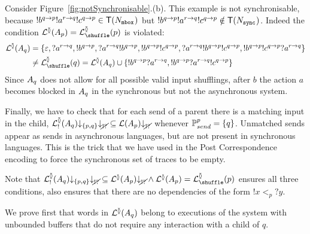\documentclass[submission,copyright,creativecommons,UKenglish]{eptcs}
\begin{document}
\begin{example}
	Consider Figure~\ref{fig:notSynchronisable}.(b).
	This example is not synchronisable, because $ !b^{q \rightarrow p} !a^{r \rightarrow q} !c^{q \rightarrow p} \in \mathsf{T}(N_{{\mathtt{mbox}}^{}}) $ but $ !b^{q \rightarrow p} !a^{r \rightarrow q} !c^{q \rightarrow p} \notin \mathsf{T}(N_{{\mathtt{sync}}^{}}) $.
	Indeed the condition $ \LangTree{\Automaton{p}} = \LangShuffle{p} $ is violated:
	\begin{align*}
		\LangTree{\Automaton{q}} &= \Set{\emptyword, \rec{a}{\rootP}{q}, \send{b}{q}{p}, \rec{a}{\rootP}{q} \send{b}{q}{p}, \send{b}{q}{p} \send{c}{q}{p}, \rec{a}{\rootP}{q} \send{b}{q}{p} \send{c}{q}{p}, \send{b}{q}{p} \send{c}{q}{p} \rec{a}{\rootP}{q}}\\
		&\neq \LangShuffle{q}
		= \LangTree{\Automaton{q}} \cup \Set{ \send{b}{q}{p} \rec{a}{\rootP}{q}, \send{b}{q}{p} \rec{a}{\rootP}{q} \send{c}{q}{p} }
	\end{align*}
	Since $ A_{q} $ does not allow for all possible valid input shufflings, after $ b $ the action $ a $ becomes blocked in $ A_{q} $ in the synchronous but not the asynchronous system.
\end{example}

Finally, we have to check that for each send of a parent there is a matching input in the child, \ie $ \mathcal{L}_{!}^{\between}{\left( A_{q} \right)}{\downarrow_{{\left\lbrace p, q \right\rbrace}}}{\downarrow_{\cancel{!?}}} \subseteq \mathcal{L}{\left(A_{p}\right)}{\downarrow_{\cancel{!?}}} $ whenever $ \mathbb{P}_{send}^{p} = {\left\lbrace q \right\rbrace} $.
Unmatched sends appear as sends in asynchronous languages, but are not present in synchronous languages.
This is the trick that we have used in the Post Correspondence encoding to force the synchronous set of traces to be empty.


Note that $ \LangTreeOut{\Automaton{q}}\projPeers{\Set{p, q}}\projMess \subseteq \LangTree{\Automaton{p}}\projMess \wedge \LangTree{\Automaton{p}} = \LangShuffle{p} $ ensures all three conditions, \ie also ensures that there are no dependencies of the form $ !x <_p ?y $.

We prove first that words in $ \mathcal{L}^{\between}{\left( A_{q} \right)} $ belong to executions of the \Mailbox system with unbounded buffers that do not require any interaction with a child of $ q $.
\end{document}
